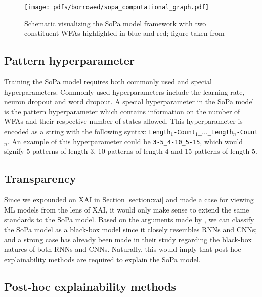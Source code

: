 \begin{figure}[t]
  \centering
  \texttt{[image: pdfs/borrowed/sopa\_computational\_graph.pdf]}
  \caption{Schematic visualizing the SoPa model framework with two constituent
    WFAs highlighted in blue and red; figure taken from
    \citet{schwartz2018sopa}}
  \label{fig:sopa}
\end{figure}

\subsection{Pattern hyperparameter}

Training the SoPa model requires both commonly used and special hyperparameters.
Commonly used hyperparameters include the learning rate, neuron dropout and word
dropout. A special hyperparameter in the SoPa model is the pattern
hyperparameter which contains information on the number of WFAs and their
respective number of states allowed. This hyperparameter is encoded as a string
with the following syntax:
\texttt{Length$_{1}$-Count$_{1}$\_$\dots$\_Length$_{n}$-Count$_{n}$}. An example
of this hyperparameter could be \texttt{3-5\_4-10\_5-15}, which would signify 5
patterns of length 3, 10 patterns of length 4 and 15 patterns of length 5.

\subsection{Transparency}

\label{section:sopa_transparency}

Since we expounded on XAI in Section \ref{section:xai} and made a case for
viewing ML models from the lens of XAI, it would only make sense to extend the
same standards to the SoPa model. Based on the arguments made by
\citet{arrieta2020explainable}, we can classify the SoPa model as a black-box
model since it closely resembles RNNs and CNNs; and a strong case has already
been made in their study regarding the black-box natures of both RNNs and CNNs.
Naturally, this would imply that post-hoc explainability methods are required to
explain the SoPa model.

\subsection{Post-hoc explainability methods}

\label{section:sopa_post_hoc}

